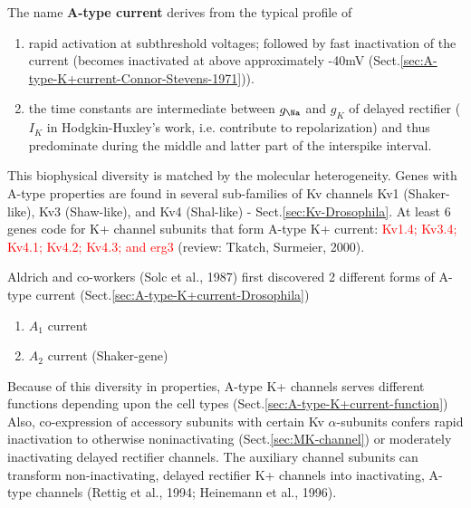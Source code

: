 The name {\bf A-type current} derives from the typical profile of
\begin{enumerate}
  \item rapid activation at subthreshold voltages; followed by fast inactivation
  of the current (becomes inactivated at above approximately -40mV
(Sect.\ref{sec:A-type-K+current-Connor-Stevens-1971})).

   \item the time constants are intermediate between $g_\Na$ and $g_K$ of
   delayed rectifier ($I_K$ in Hodgkin-Huxley's work, i.e. contribute to
   repolarization) and thus predominate during the middle and latter part of the
   interspike interval.
\end{enumerate}
This biophysical diversity is matched by the  molecular heterogeneity.
Genes with A-type properties are found in several sub-families of Kv channels
Kv1 (Shaker-like), Kv3 (Shaw-like), and Kv4 (Shal-like) -
Sect.\ref{sec:Kv-Drosophila}. At least 6 genes code for K+ channel subunits that
form A-type K+ current: \textcolor{red}{Kv1.4; Kv3.4; Kv4.1; Kv4.2; Kv4.3; and
erg3} (review: Tkatch, Surmeier, 2000).

Aldrich and co-workers (Solc et al., 1987) first discovered 2 different forms of
A-type current (Sect.\ref{sec:A-type-K+current-Drosophila})
\begin{enumerate}
  \item $A_1$ current
  
  \item $A_2$ current (Shaker-gene) 
\end{enumerate}


Because of this diversity in properties, A-type K+ channels serves different
functions depending upon the cell types
(Sect.\ref{sec:A-type-K+current-function}) Also, co-expression of accessory
subunits with certain Kv $\alpha$-subunits confers rapid inactivation to
otherwise noninactivating (Sect.\ref{sec:MK-channel}) or moderately inactivating
delayed rectifier channels.
The auxiliary channel subunits can transform non-inactivating, delayed rectifier
K+ channels into inactivating, A-type channels (Rettig et al., 1994; Heinemann
et al., 1996).


